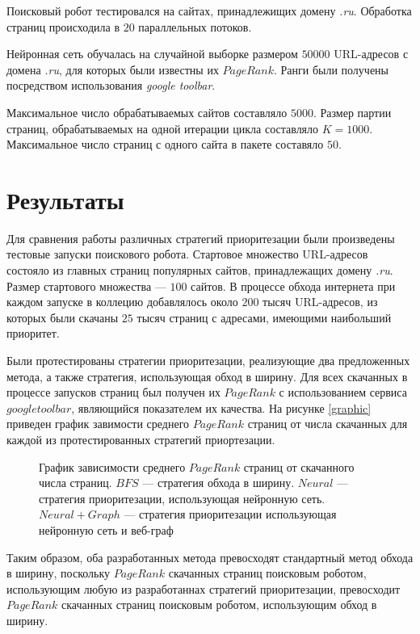 Поисковый робот тестировался на сайтах, принадлежищих домену \textit{.ru}. Обработка страниц происходила в $20$ параллельных потоков.

Нейронная сеть обучалась на случайной выборке размером $50000$ URL-адресов с домена \textit{.ru}, для которых были известны их $PageRank$. Ранги были получены посредством использования \textit{google toolbar}. 

Максимальное число обрабатываемых сайтов составляло $5000$. Размер партии страниц, обрабатываемых на одной итерации цикла составляло $K = 1000$. Максимальное число страниц с одного сайта в пакете составяло $50$. 

\section{Результаты}

Для сравнения работы различных стратегий приоритезации были произведены тестовые запуски поискового робота. Стартовое множество URL-адресов состояло из главных страниц популярных сайтов, принадлежащих домену \textit{.ru}. Размер стартового множества --- $100$ сайтов. В процессе обхода интернета при каждом запуске в коллецию добавлялось около $200$ тысяч URL-адресов, из которых были скачаны $25$ тысяч страниц с адресами, имеющими наибольший приоритет. 

Были протестированы стратегии приоритезации, реализующие два предложенных метода, а также стратегия, использующая обход в ширину. Для всех скачанных в процессе запусков страниц был получен их $PageRank$ с использованием сервиса $google toolbar$, являющийся показателем их качества. На рисунке \ref{graphic} приведен график завимости среднего $PageRank$ страниц от числа скачанных для каждой из протестированных стратегий приортезации.

\begin{figure}[h!]
\caption{График зависимости среднего $PageRank$ страниц от скачанного числа страниц. $BFS$ --- стратегия обхода в ширину. $Neural$ --- стратегия приоритезации, использующая нейронную сеть. $Neural + Graph$ --- стратегия приоритезации использующая нейронную сеть и веб-граф}
\label{architecture}
\end{figure}

Таким образом, оба разработанных метода превосходят стандартный метод обхода в ширину, поскольку $PageRank$ скачанных страниц поисковым роботом, использующим любую из разработаннах стратегий приоритезации, превосходит $PageRank$ скачанных страниц поисковым роботом, использующим обход в ширину.